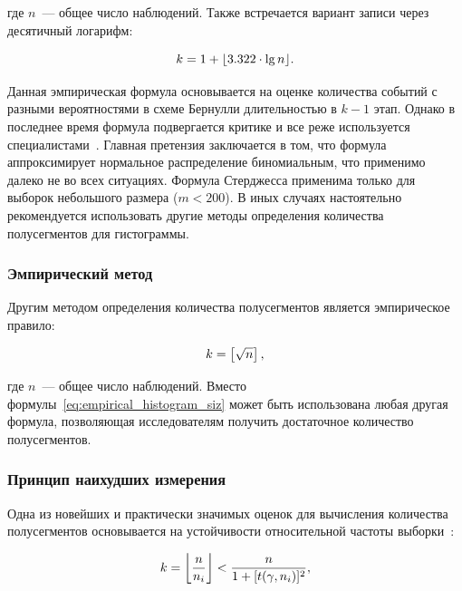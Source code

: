 \documentclass[a4paper, article, 14pt]{extarticle}
\begin{document}
\noindent где $n$~--- общее число наблюдений. Также встречается вариант записи через десятичный логарифм:

\begin{equation}\label{eq:sturges_lg}
	k = 1 + \floor*{3.322 \cdot \lg{n}}.
\end{equation}

Данная эмпирическая формула основывается на оценке количества событий с разными вероятностями в схеме Бернулли длительностью в $k - 1$ этап. Однако в последнее время формула подвергается критике и все реже используется специалистами~\cite{hyndman}. Главная претензия заключается в том, что формула аппроксимирует нормальное распределение биномиальным, что применимо далеко не во всех ситуациях. Формула Стерджесса применима только для выборок небольшого размера ($m < 200$). В иных случаях настоятельно рекомендуется использовать другие методы определения количества полусегментов для гистограммы.

\subsubsection{Эмпирический метод}\label{sec:empirical_histogram_size_scott}

Другим методом определения количества полусегментов является эмпирическое правило:

\begin{equation}\label{eq:empirical_histogram_siz}
	k = \round{\sqrt{n}},
\end{equation}

\noindent где $n$~--- общее число наблюдений. Вместо формулы~\eqref{eq:empirical_histogram_siz} может быть использована любая другая формула, позволяющая исследователям получить достаточное количество полусегментов.

\subsubsection{Принцип наихудших измерения}\label{sec:frequency_histogram_size_worst_case}

Одна из новейших и практически значимых оценок для вычисления количества полусегментов основывается на устойчивости относительной частоты выборки~\cite{petrushyn_ulyanov_definitions}:

\begin{equation}\label{eq:petrushyn_ulyanov_histogram}
	k = \floor*{\frac{n}{n_i}} < \frac{n}{1 + [t(\gamma, n_i)]^2},
\end{equation}
\end{document}
